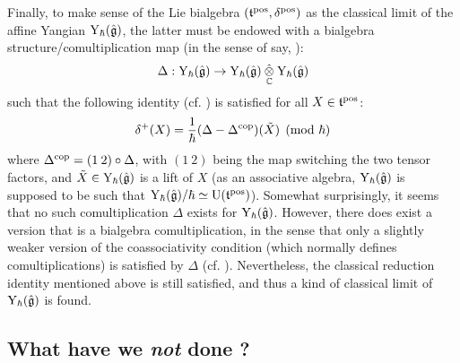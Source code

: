         Finally, to make sense of the Lie bialgebra $(\mathfrak{t}^{\mathrm{pos}}, \delta^{\mathrm{pos}})$ as the classical limit of the affine Yangian $\mathrm{Y}_{\hbar}(\hat{\mathfrak{g}})$, the latter must be endowed with a bialgebra structure/comultiplication map (in the sense of say, \cite[Chapter 3]{kassel_quantum_groups}):
            $$\Delta: \rmY_{\hbar}(\hat{\g}) \to \rmY_{\hbar}(\hat{\g}) \hattensor_{\bbC} \rmY_{\hbar}(\hat{\g})$$
        such that the following  identity (cf. \cite{etingof_kazhdan_quantisation_1}) is satisfied for all $X \in \mathfrak{t}^{\mathrm{pos}}$:
            $$\delta^+(X) = \frac{1}{\hbar}( \Delta - \Delta^{\mathrm{cop}} )(\tilde{X}) \pmod{\hbar}$$
        where $\Delta^{\mathrm{cop}} = (1 \: 2) \circ \Delta$, with $(1 \: 2)$ being the map switching the two tensor factors, and $\tilde{X} \in \mathrm{Y}_{\hbar}(\hat{\mathfrak{g}})$ is a lift of $X$ (as an associative algebra, $\mathrm{Y}_{\hbar}(\hat{\mathfrak{g}})$ is supposed to be such that $\mathrm{Y}_{\hbar}(\hat{\mathfrak{g}})/\hbar \simeq \mathrm{U}(\mathfrak{t}^{\mathrm{pos}})$). Somewhat surprisingly, it seems that no such comultiplication $\Delta$ exists for $\mathrm{Y}_{\hbar}(\hat{\mathfrak{g}})$. However, there does exist a version that is  a bialgebra comultiplication, in the sense that only a slightly weaker version of the coassociativity condition (which normally defines comultiplications) is satisfied by $\Delta$ (cf. \cite{guay_nakajima_wendlandt_affine_yangian_coproduct}). Nevertheless, the classical reduction identity mentioned above is still satisfied, and thus a kind of classical limit of $\mathrm{Y}_{\hbar}(\hat{\mathfrak{g}})$ is found.


    \subsection{What have we \textit{not} done ?}